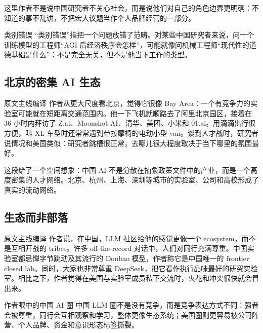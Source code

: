这里作者不是说中国研究者不关心社会，而是说他们对自己的角色边界更明确：不知道的事不乱讲，不把宏大议题当作个人品牌经营的一部分。

\begin{knowledgebox}{类别错误}
``类别错误''指把一个问题放错了范畴。对某些中国研究者来说，问一个训练模型的工程师``AGI 后经济秩序会怎样''，可能就像问机械工程师``现代性的道德基础是什么''：不是完全无关，但不是他当下工作的类型。
\end{knowledgebox}

\subsection{北京的密集 AI 生态}

\begin{translationbox}{原文主线编译}
作者从更大尺度看北京，觉得它很像 Bay Area：一个有竞争力的实验室可能就在短距离交通范围内。他一下飞机就顺路去了阿里北京园区，接着在 36 小时内拜访了 Z.ai、Moonshot AI、清华、美团、小米和 01.ai。用滴滴出行很方便，叫 XL 车型时还常常遇到带按摩椅的电动小型 van。谈到人才战时，研究者说情况和美国类似：研究者跳槽很正常，去哪儿很大程度取决于当下哪里的氛围最好。
\end{translationbox}

这段给了一个空间想象：中国 AI 不是分散在抽象政策文件中的产业，而是一个高度密集的人才网络。北京、杭州、上海、深圳等城市的实验室、公司和高校形成了真实的流动网络。

\subsection{生态而非部落}

\begin{translationbox}{原文主线编译}
作者说，在中国，LLM 社区给他的感觉更像一个 ecosystem，而不是互相开战的 tribes。许多 off-the-record 对话中，人们对同行充满尊重。中国实验室都忌惮字节跳动及其流行的 Doubao 模型，作者称它是中国唯一的 frontier closed lab。同时，大家也非常尊重 DeepSeek，把它看作执行品味最好的研究实验室。相比之下，作者觉得在美国与实验室成员私下交流时，火花和冲突很快就会冒出来。
\end{translationbox}

\begin{importantbox}{作者眼中的中国 AI 圈}
中国 LLM 圈不是没有竞争，而是竞争表达方式不同：强者会被尊重，同行会互相观察和学习，整体更像生态系统；美国圈则更容易被公司阵营、个人品牌、资金和意识形态标签撕裂。
\end{importantbox}


